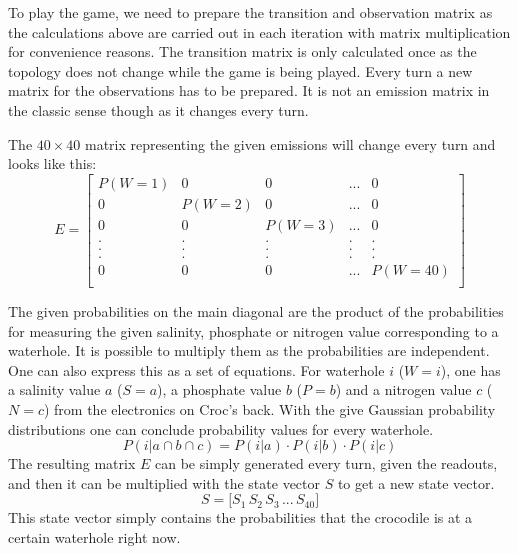 \documentclass[a4paper]{article}
\begin{document}
To play the game, we need to prepare the transition and observation matrix as the calculations above are carried out in each iteration with matrix multiplication for convenience reasons. The transition matrix is only calculated once as the topology does not change while the game is being played. Every turn a new matrix for the observations has to be prepared. It is not an emission matrix in the classic sense though as it changes every turn. 

The \ensuremath{40 \times 40} matrix representing the given emissions will change every turn and looks like this:
\vskip 0.5cm
\begin{equation}
E = \begin{bmatrix}
       P(W=1)	& 0 		& 0 & ... 	& 0 			\\
       0 		& P(W=2) 	& 0 & ... 	& 0 			\\
       0 		& 0 		& P(W=3) 	& ... & 0 		\\
	   . 		& .  		& .       	& .   & . 		\\
       . 		& .  		& .       	& .   & . 		\\
       . 		& .  		& .      	& .   & . 		\\
       0 		& 0 		&    0   	& ... & P(W=40)	\\
     \end{bmatrix}
\end{equation}
\vskip 0.5cm

The given probabilities on the main diagonal are the product of the probabilities for measuring the given salinity, phosphate or nitrogen value corresponding to a waterhole. It is possible to multiply them as the probabilities are independent. One can also express this as a set of equations. 
For waterhole $i$ ($W=i$), one has a salinity value $a$ ($S=a$), a phosphate value $b$ ($P=b$) and a nitrogen value $c$ ($N=c$) from the electronics on Croc's back. With the give Gaussian probability distributions one can conclude probability values for every waterhole. 
\begin{equation}
	P(i|a\cap b \cap c) = P(i|a) \cdot P(i|b) \cdot P(i|c)
\end{equation}
The resulting matrix \ensuremath{E} can be simply generated every turn, given the readouts, and then it can be multiplied with the state vector \ensuremath{S} to get a new state vector. 
\begin{equation}
	S = \bigl[ S_1\,S_2\,S_3\,...\,S_{40}\bigr]
\end{equation}
This state vector simply contains the probabilities that the crocodile is at a certain waterhole right now.
\end{document}
